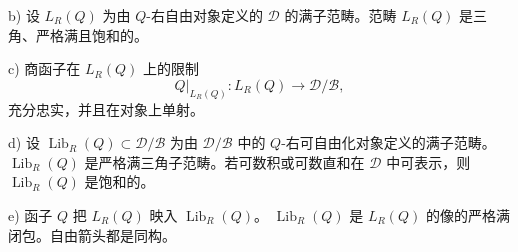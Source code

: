 \par\noindent b) 设 $L_R(Q)$ 为由 $Q$-右自由对象定义的
$\mathcal D$ 的满子范畴。范畴 $L_R(Q)$ 是三角、严格满且饱和的。
\par\noindent c) 商函子在 $L_R(Q)$ 上的限制
\[
  Q|_{L_R(Q)}\colon L_R(Q)\longrightarrow\mathcal D/\mathcal B
  ,
\]
充分忠实，并且在对象上单射。
\par\noindent d) 设
$\operatorname{Lib}_R(Q)\subset\mathcal D/\mathcal B$ 为由
$\mathcal D/\mathcal B$ 中的 $Q$-右可自由化对象定义的满子范畴。
$\operatorname{Lib}_R(Q)$ 是严格满三角子范畴。若可数积或可数直和在
$\mathcal D$ 中可表示，则 $\operatorname{Lib}_R(Q)$ 是饱和的。
\par\noindent e) 函子 $Q$ 把 $L_R(Q)$ 映入 $\operatorname{Lib}_R(Q)$。
$\operatorname{Lib}_R(Q)$ 是 $L_R(Q)$ 的像的严格满闭包。自由箭头都是同构。
\endgroup
\endgroup
